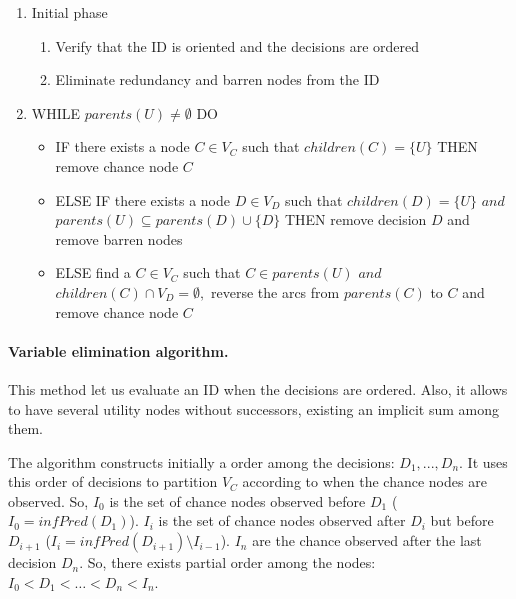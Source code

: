 \begin{enumerate}
\item Initial phase

\begin{enumerate}
\item Verify that the ID is oriented and the decisions are ordered

\item Eliminate redundancy and barren nodes from the ID
\end{enumerate}

\item WHILE $parents(U)\neq \emptyset $ DO

\begin{itemize}
\item IF there exists a node $C\in V_{C}$ such that $children(C)=\{U\}$ THEN
remove chance node $C$

\item ELSE IF there exists a node $D\in V_{D}$ such that $children(D)=\{U\}$
$and$ $parents(U)\subseteq parents(D)\cup \{D\}$ THEN remove decision $D$
and remove barren nodes

\item ELSE find a $C\in V_{C}$ such that $C\in parents(U)$ $and$ $%
children(C)\cap V_{D}=\emptyset ,$ reverse the arcs from $parents(C)$ to $C$
and remove chance node $C$
\end{itemize}
\end{enumerate}

\paragraph{Variable elimination algorithm.}

This method let us evaluate an ID when the decisions are ordered. Also, it
allows to have several utility nodes without successors, existing an
implicit sum among them.

The algorithm constructs initially a order among the decisions: $%
D_{1},...,D_{n}.$ It uses this order of decisions to partition $V_{C}$
according to when the chance nodes are observed. So, $I_{0}$ is the set of
chance nodes observed before $D_{1}$ ($I_{0}=infPred(D_{1})$)$.$ $I_{i}$ is
the set of chance nodes observed after $D_{i}$ but before $D_{i+1}$ ($%
I_{i}=infPred(D_{i+1})\setminus I_{i-1}$). $I_{n}$ are the chance observed
after the last decision $D_{n}$. So, there exists partial order among the
nodes: {\normalsize $I_{0}<D_{1}<\ldots <D_{n}<I_{n}.$}

